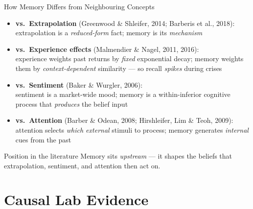 \documentclass[aspectratio=169, 11pt]{beamer}
\begin{document}
\begin{frame}{How Memory Differs from Neighbouring Concepts}
\begin{itemize}
\item \textbf{vs.\ Extrapolation} (Greenwood \& Shleifer, 2014; Barberis et al., 2018):\\
  extrapolation is a \emph{reduced-form} fact; memory is its \emph{mechanism}
\item \textbf{vs.\ Experience effects} (Malmendier \& Nagel, 2011, 2016):\\
  experience weights past returns by \emph{fixed} exponential decay; memory weights them by \emph{context-dependent} similarity --- so recall \emph{spikes} during crises
\item \textbf{vs.\ Sentiment} (Baker \& Wurgler, 2006):\\
  sentiment is a market-wide mood; memory is a within-inferior cognitive process that \emph{produces} the belief input
\item \textbf{vs.\ Attention} (Barber \& Odean, 2008; Hirshleifer, Lim \& Teoh, 2009):\\
  attention selects \emph{which external} stimuli to process; memory generates \emph{internal} cues from the past
\end{itemize}
\vfill
\begin{block}{Position in the literature}
Memory sits \emph{upstream} --- it shapes the beliefs that extrapolation, sentiment, and attention then act on.
\end{block}
\end{frame}

\section{Causal Lab Evidence}
\end{document}
